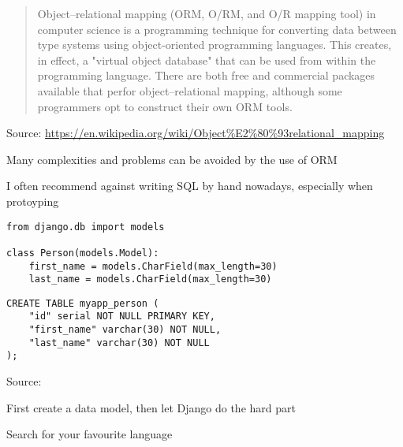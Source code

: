 \documentclass[Screen16to9,17pt]{foils}
\begin{document}


\begin{quote}
Object–relational mapping (ORM, O/RM, and O/R mapping tool) in computer science is a programming technique for converting data between type systems using object-oriented programming languages. This creates, in effect, a "virtual object database" that can be used from within the programming language. There are both free and commercial packages available that perfor object–relational mapping, although some programmers opt to construct their own ORM tools.
\end{quote}
Source: \url{https://en.wikipedia.org/wiki/Object%E2%80%93relational_mapping}

\begin{list2}
\item Many complexities and problems can be avoided by the use of ORM
\item I often recommend against writing SQL by hand nowadays, especially when protoyping
\end{list2}



\begin{verbatim}
from django.db import models

class Person(models.Model):
    first_name = models.CharField(max_length=30)
    last_name = models.CharField(max_length=30)
\end{verbatim}

\begin{verbatim}
CREATE TABLE myapp_person (
    "id" serial NOT NULL PRIMARY KEY,
    "first_name" varchar(30) NOT NULL,
    "last_name" varchar(30) NOT NULL
);
\end{verbatim}


Source: 
\begin{list2}
\item First create a data model, then let Django do the hard part
\item Search for your favourite language
\end{list2}



\end{document}
